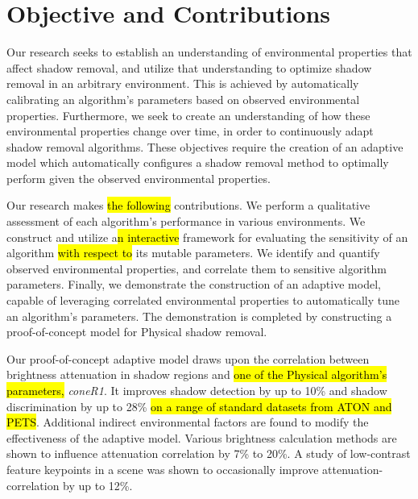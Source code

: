 \documentclass[12pt]{report}
\begin{document}

\FloatBarrier
\section{Objective and Contributions}

Our research seeks to establish an understanding of environmental properties that affect shadow removal, and utilize that understanding to optimize shadow removal in an arbitrary environment. This is achieved by automatically calibrating an algorithm's parameters based on observed environmental properties. Furthermore, we seek to create an understanding of how these environmental properties change over time, in order to continuously adapt shadow removal algorithms. These objectives require the creation of an adaptive model which automatically configures a shadow removal method to optimally perform given the observed environmental properties.

Our research makes \hl{the following} contributions. We perform a qualitative assessment of each algorithm's performance in various environments. We construct and utilize a\hl{n interactive} framework for evaluating the sensitivity of an algorithm \hl{with respect to} its mutable parameters. We identify and quantify observed environmental properties, and correlate them to sensitive algorithm parameters. Finally, we demonstrate the construction of an adaptive model, capable of leveraging correlated environmental properties to automatically tune an algorithm's parameters. The demonstration is completed by constructing a proof-of-concept model for Physical shadow removal.

Our proof-of-concept adaptive model draws upon the correlation between brightness attenuation in shadow regions and \hl{one of the Physical algorithm's parameters, }\textit{coneR1}. It improves shadow detection by up to 10\% and shadow discrimination by up to 28\% \hl{on a range of standard datasets from ATON and PETS}. Additional indirect environmental factors are found to modify the effectiveness of the adaptive model. Various brightness calculation methods are shown to influence attenuation correlation by 7\% to 20\%.
A study of low-contrast feature keypoints in a scene was shown to occasionally improve attenuation-correlation by up to 12\%.
\end{document}
